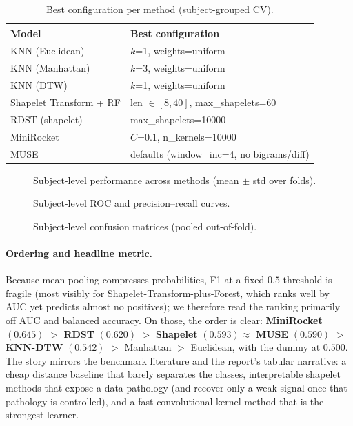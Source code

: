 \begin{table}[H]
\centering
\small
\caption{Best configuration per method (subject-grouped CV).}
\label{tab:ts_params}
\begin{tabular}{l l}
\hline
Model & Best configuration \\
\hline
KNN (Euclidean) & $k$=1, weights=uniform \\
KNN (Manhattan) & $k$=3, weights=uniform \\
KNN (DTW) & $k$=1, weights=uniform \\
Shapelet Transform + RF & len $\in[8,40]$, max\_shapelets=60 \\
RDST (shapelet) & max\_shapelets=10000 \\
MiniRocket & $C$=0.1, n\_kernels=10000 \\
MUSE & defaults (window\_inc=4, no bigrams/diff) \\
\hline
\end{tabular}
\end{table}

\begin{figure}[h]
    \centering
    \caption{Subject-level performance across methods (mean $\pm$ std over folds).}
    \label{fig:ts_compare}
\end{figure}

\begin{figure}[h]
    \centering
    \caption{Subject-level ROC and precision--recall curves.}
    \label{fig:ts_roc}
\end{figure}

\begin{figure}[h]
    \centering
    \caption{Subject-level confusion matrices (pooled out-of-fold).}
    \label{fig:ts_cm}
\end{figure}

\paragraph{Ordering and headline metric.} Because mean-pooling compresses probabilities, F1 at a fixed $0.5$ threshold is fragile (most visibly for Shapelet-Transform-plus-Forest, which ranks well by AUC yet predicts almost no positives); we therefore read the ranking primarily off AUC and balanced accuracy. On those, the order is clear: \textbf{MiniRocket} $(0.645)$ $>$ \textbf{RDST} $(0.620)$ $>$ \textbf{Shapelet} $(0.593) \approx$ \textbf{MUSE} $(0.590)$ $>$ \textbf{KNN-DTW} $(0.542)$ $>$ Manhattan $>$ Euclidean, with the dummy at $0.500$. The story mirrors the benchmark literature and the report's tabular narrative: a cheap distance baseline that barely separates the classes, interpretable shapelet methods that expose a data pathology (and recover only a weak signal once that pathology is controlled), and a fast convolutional kernel method that is the strongest learner.

